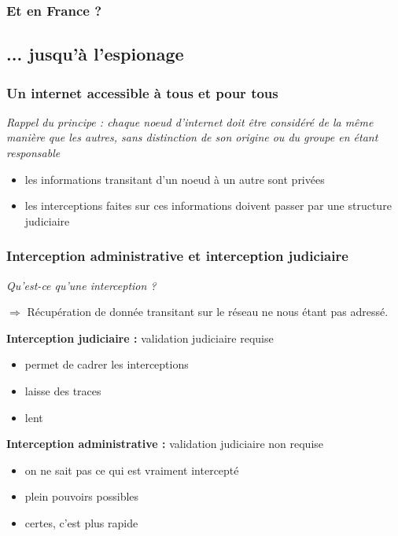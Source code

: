\begin{frame}\frametitle{Et en France ?}
\end{frame}


\subsection{... jusqu'à l'espionage}
\begin{frame}\frametitle{Un internet accessible à tous et pour tous}
    \emph{Rappel du principe : chaque noeud d'internet doit être considéré de
        la même manière que les autres, sans distinction de son origine ou du
    groupe en étant responsable}

    \vspace{1em}

    \begin{itemize}
        \item les informations transitant d'un noeud à un autre sont privées
        \item les interceptions faites sur ces informations doivent passer par
            une structure judiciaire
    \end{itemize}
\end{frame}


\begin{frame}\frametitle{Interception administrative et interception judiciaire}
    \emph{Qu'est-ce qu'une interception ?}

    $\Rightarrow$ Récupération de donnée transitant sur le réseau ne nous étant
    pas adressé.

    \vspace{1em}

    \textbf{Interception judiciaire :} validation judiciaire requise
    \begin{itemize}
        \item permet de cadrer les interceptions
        \item laisse des traces
        \item lent
    \end{itemize}

    \textbf{Interception administrative :} validation judiciaire non requise
    \begin{itemize}
        \item on ne sait pas ce qui est vraiment intercepté
        \item plein pouvoirs possibles
        \item certes, c'est plus rapide
    \end{itemize}
\end{frame}


